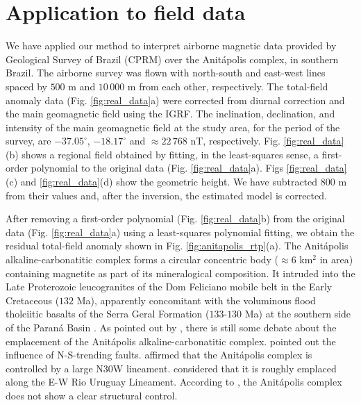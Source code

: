 \section{Application to field data}

We have applied our method to interpret airborne magnetic data provided by 
Geological Survey of Brazil (CPRM) over the Anit{\'a}polis complex, 
in southern Brazil. 
The airborne survey was flown with north-south and east-west lines spaced by $500$ m and $10\,000$ m from each other, respectively. 
The total-field anomaly data (Fig. \ref{fig:real_data}a) were corrected from diurnal correction and the main geomagnetic field using the IGRF. 
The inclination, declination, and intensity of the main geomagnetic field at the study area, 
for the period of the survey, are $-37.05^{\circ}$, $-18.17^{\circ}$ and 
$\approx 22 \, 768 $ nT, respectively.
Fig. \ref{fig:real_data}(b) shows a regional field obtained by fitting, in the least-squares sense, a first-order polynomial to the original data (Fig. \ref{fig:real_data}a).
Figs \ref{fig:real_data}(c) and \ref{fig:real_data}(d) show the geometric height.
We have subtracted 800 m from their values and, after the inversion, the estimated model is corrected.  

After removing a first-order polynomial (Fig. \ref{fig:real_data}b) from the original data  
(Fig. \ref{fig:real_data}a) using a least-squares polynomial fitting, we obtain the residual total-field anomaly shown in Fig. \ref{fig:anitapolis_rtp}(a).
The Anit{\'a}polis alkaline-carbonatitic complex forms a circular concentric body 
($\approx 6$ km$^{2}$ in area) containing magnetite as part of its mineralogical 
composition. 
It intruded into the Late Proterozoic leucogranites of the Dom Feliciano 
mobile belt in the Early Cretaceous ($132$ Ma), apparently concomitant with the 
voluminous flood tholeiitic basalts of the Serra Geral Formation ($133$-$130$ Ma) 
at the southern side of the Paran{\'a} Basin \citep{gibson-1999, scheibe-etal2005}.
As pointed out by \citet{GOMES2018}, there is still some debate about the emplacement 
of the Anit{\'a}polis alkaline-carbonatitic complex. 
\citet{melcher-coutinho1966} pointed out the influence of N-S-trending faults.
\citet{horbach-marimon1980} affirmed that the Anit{\'a}polis complex is controlled by 
a large N30W lineament. 
\citet{scheibe-etal2005} considered that it is roughly emplaced along the E-W Rio 
Uruguay Lineament. 
According to \citet{riccomini-etal2005}, the Anit{\'a}polis 
complex does not show a clear structural control. 

